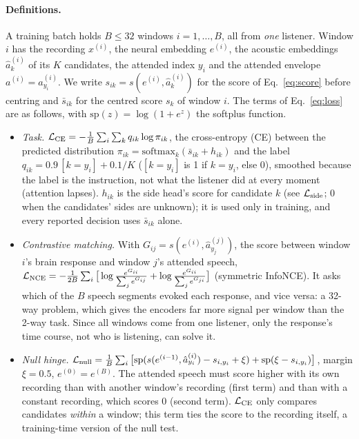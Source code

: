 \documentclass[twoside]{article}
\begin{document}
\paragraph{Definitions.} A training batch holds $B\le32$ windows $i=1,\dots,B$, all from \emph{one}
listener. Window $i$ has the recording $x^{(i)}$, the neural embedding $e^{(i)}$, the
acoustic embeddings $\hat a^{(i)}_k$ of its $K$ candidates, the attended index $y_i$ and the
attended envelope $a^{(i)}=a^{(i)}_{y_i}$. We write $s_{ik}=s(e^{(i)},\hat a^{(i)}_k)$ for the
score of Eq.~\ref{eq:score} before centring and $\bar s_{ik}$ for the centred score $s_k$ of
window $i$. The terms of Eq.~\ref{eq:loss} are as follows, with $\mathrm{sp}(z)=\log(1+e^z)$ the softplus function.
\begin{itemize}\setlength\itemsep{1pt}
\item \emph{Task.} $\mathcal L_{\rm CE}=-\frac1B\sum_i\sum_k q_{ik}\log\pi_{ik}$, the
cross-entropy (CE) between the predicted distribution $\pi_{ik}=\mathrm{softmax}_k(\bar s_{ik}+
h_{ik})$ and the label $q_{ik}=0.9\,[k{=}y_i]+0.1/K$ ($[k{=}y_i]$ is 1 if $k=y_i$, else 0), smoothed because the label is the
instruction, not what the listener did at every moment (attention lapses). $h_{ik}$ is the
side head's score for candidate $k$ (see $\mathcal L_{\rm side}$; 0 when the candidates'
sides are unknown); it is used only in training, and every reported decision uses
$\bar s_{ik}$ alone.
\item \emph{Contrastive matching.} With $G_{ij}=s(e^{(i)},\hat a^{(j)}_{y_j})$, the score
between window $i$'s brain response and window $j$'s attended speech,
$\mathcal L_{\rm NCE}=-\frac{1}{2B}\sum_i\big[\log\frac{e^{G_{ii}}}{\sum_j e^{G_{ij}}}+
\log\frac{e^{G_{ii}}}{\sum_j e^{G_{ji}}}\big]$ (symmetric InfoNCE). It asks which of the $B$
speech segments evoked each response, and vice versa: a 32-way problem, which gives the
encoders far more signal per window than the 2-way task. Since all windows come from one
listener, only the response's time course, not who is listening, can solve it.
\item \emph{Null hinge.} $\mathcal L_{\rm null}=\frac1B\sum_i\big[\mathrm{sp}(s(e^{(i-1)},
\hat a^{(i)}_{y_i})-s_{i,y_i}+\xi)+\mathrm{sp}(\xi-s_{i,y_i})\big]$, margin $\xi=0.5$,
$e^{(0)}=e^{(B)}$. The attended speech must score higher with its own recording than with
another window's recording (first term) and than with a constant recording, which scores 0
(second term). $\mathcal L_{\rm CE}$ only compares candidates \emph{within} a window; this
term ties the score to the recording itself, a training-time version of the null test.

\end{itemize}
\end{document}
